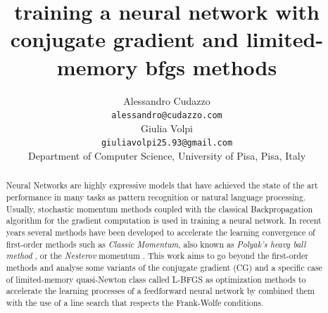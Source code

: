 
\title{training a neural network with conjugate gradient and limited-memory bfgs methods}
\author{
  Alessandro Cudazzo \\
  \texttt{alessandro@cudazzo.com} \\
   \And
  Giulia Volpi \\
  \texttt{giuliavolpi25.93@gmail.com} \\
  \AND
  Department of Computer Science, University of Pisa, Pisa, Italy
}




\maketitle
\begin{abstract}
Neural Networks are highly expressive models that have achieved the state of the art performance in many tasks as pattern recognition or natural language processing. Usually, stochastic momentum methods coupled with the classical Backpropagation algorithm for the gradient computation is used in training a neural network.
In recent years several methods have been developed to accelerate the learning convergence of first-order methods such as \textit{Classic Momentum}, also known as \textit{Polyak's heavy ball method} \cite{Polyak1964}, or the \textit{Nesterov} momentum \cite{10029946121}.
This work aims to go beyond the first-order methods and analyse some variants of the conjugate gradient (CG) and a specific case of limited-memory quasi-Newton class called L-BFGS as optimization methods to accelerate the learning processes of a feedforward neural network by combined them with the use of a line search that respects the Frank-Wolfe conditions. 
\end{abstract}

